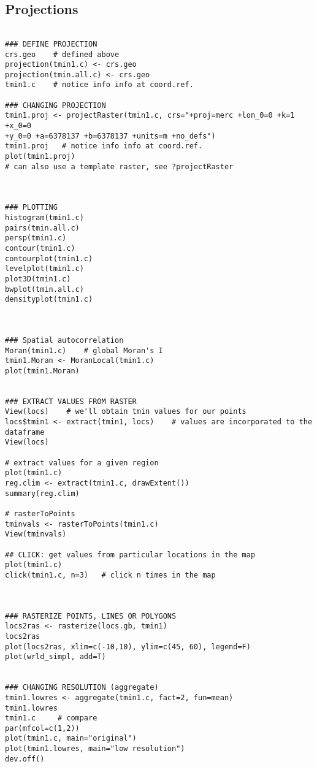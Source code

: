 \subsection{Projections}
\begin{verbatim} 
 
### DEFINE PROJECTION
crs.geo    # defined above
projection(tmin1.c) <- crs.geo
projection(tmin.all.c) <- crs.geo
tmin1.c    # notice info info at coord.ref.
 
### CHANGING PROJECTION
tmin1.proj <- projectRaster(tmin1.c, crs="+proj=merc +lon_0=0 +k=1 +x_0=0
+y_0=0 +a=6378137 +b=6378137 +units=m +no_defs")
tmin1.proj   # notice info info at coord.ref.
plot(tmin1.proj)
# can also use a template raster, see ?projectRaster
 
 
 
### PLOTTING
histogram(tmin1.c)
pairs(tmin.all.c)
persp(tmin1.c)
contour(tmin1.c)
contourplot(tmin1.c)
levelplot(tmin1.c)
plot3D(tmin1.c)
bwplot(tmin.all.c)
densityplot(tmin1.c)
 
 
 
### Spatial autocorrelation
Moran(tmin1.c)    # global Moran's I
tmin1.Moran <- MoranLocal(tmin1.c)
plot(tmin1.Moran)
 
 
### EXTRACT VALUES FROM RASTER
View(locs)    # we'll obtain tmin values for our points
locs$tmin1 <- extract(tmin1, locs)    # values are incorporated to the
dataframe
View(locs)
 
# extract values for a given region
plot(tmin1.c)
reg.clim <- extract(tmin1.c, drawExtent())
summary(reg.clim)
 
# rasterToPoints
tminvals <- rasterToPoints(tmin1.c)
View(tminvals)
 
## CLICK: get values from particular locations in the map
plot(tmin1.c)
click(tmin1.c, n=3)   # click n times in the map
 
 
 
### RASTERIZE POINTS, LINES OR POLYGONS
locs2ras <- rasterize(locs.gb, tmin1)
locs2ras
plot(locs2ras, xlim=c(-10,10), ylim=c(45, 60), legend=F)
plot(wrld_simpl, add=T)
 
 
### CHANGING RESOLUTION (aggregate)
tmin1.lowres <- aggregate(tmin1.c, fact=2, fun=mean)
tmin1.lowres
tmin1.c     # compare
par(mfcol=c(1,2))
plot(tmin1.c, main="original")
plot(tmin1.lowres, main="low resolution")
dev.off()
 
 
  \end{verbatim}
